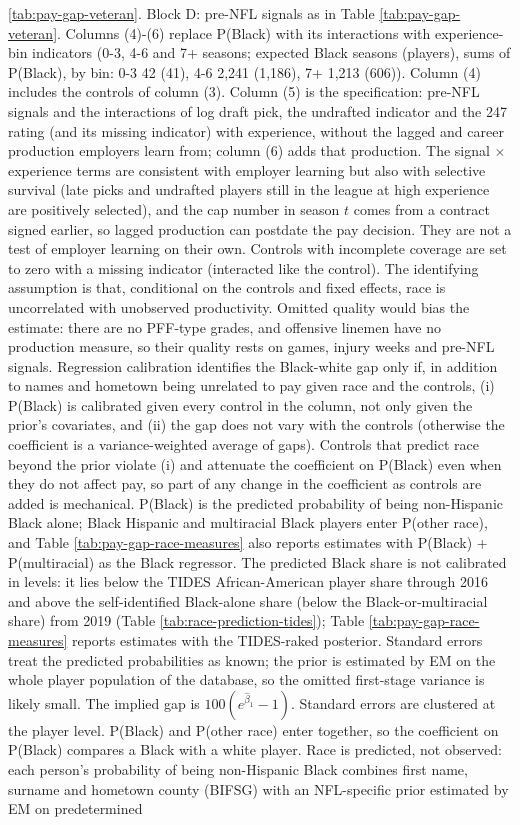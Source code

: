\begin{table}[!h]
{\begin{threeparttable}
\begin{tablenotes}[para]
\ref{tab:pay-gap-veteran}. Block D: pre-NFL signals as in Table \ref{tab:pay-gap-veteran}. Columns (4)-(6) replace P(Black) with its interactions with experience-bin indicators (0-3, 4-6 and 7+ seasons; expected Black seasons (players), sums of P(Black), by bin: 0-3 42 (41), 4-6 2,241 (1,186), 7+ 1,213 (606)). Column (4) includes the controls of column (3). Column (5) is the \citet{altonji2001employer} specification: pre-NFL signals and the interactions of log draft pick, the undrafted indicator and the 247 rating (and its missing indicator) with experience, without the lagged and career production employers learn from; column (6) adds that production. The signal $\times$ experience terms are consistent with employer learning but also with selective survival (late picks and undrafted players still in the league at high experience are positively selected), and the cap number in season $t$ comes from a contract signed earlier, so lagged production can postdate the pay decision. They are not a test of employer learning on their own. Controls with incomplete coverage are set to zero with a missing indicator (interacted like the control). The identifying assumption is that, conditional on the controls and fixed effects, race is uncorrelated with unobserved productivity. Omitted quality would bias the estimate: there are no PFF-type grades, and offensive linemen have no production measure, so their quality rests on games, injury weeks and pre-NFL signals. Regression calibration identifies the Black-white gap only if, in addition to names and hometown being unrelated to pay given race and the controls, (i) P(Black) is calibrated given every control in the column, not only given the prior's covariates, and (ii) the gap does not vary with the controls (otherwise the coefficient is a variance-weighted average of gaps). Controls that predict race beyond the prior violate (i) and attenuate the coefficient on P(Black) even when they do not affect pay, so part of any change in the coefficient as controls are added is mechanical. P(Black) is the predicted probability of being non-Hispanic Black alone; Black Hispanic and multiracial Black players enter P(other race), and Table \ref{tab:pay-gap-race-measures} also reports estimates with P(Black) + P(multiracial) as the Black regressor. The predicted Black share is not calibrated in levels: it lies below the TIDES African-American player share through 2016 and above the self-identified Black-alone share (below the Black-or-multiracial share) from 2019 (Table \ref{tab:race-prediction-tides}); Table \ref{tab:pay-gap-race-measures} reports estimates with the TIDES-raked posterior. Standard errors treat the predicted probabilities as known; the prior is estimated by EM on the whole player population of the database, so the omitted first-stage variance is likely small. The implied gap is $100(e^{\hat\beta_1}-1)$. Standard errors are clustered at the player level. P(Black) and P(other race) enter together, so the coefficient on P(Black) compares a Black with a white player. Race is predicted, not observed: each person's probability of being non-Hispanic Black combines first name, surname and hometown county (BIFSG) with an NFL-specific prior estimated by EM on predetermined 
\end{tablenotes}
\end{threeparttable}}
\end{table}
